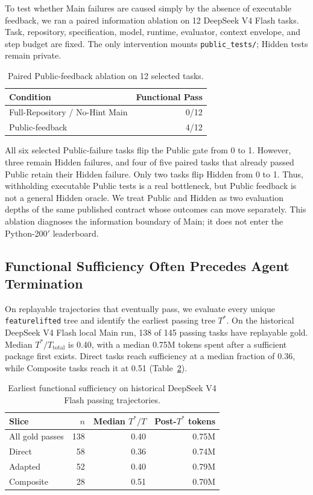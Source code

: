 \documentclass[acmsmall,anonymous,review,screen]{acmart}
\begin{document}
To test whether Main failures are caused simply by the absence of executable
feedback, we ran a paired information ablation on 12 DeepSeek V4 Flash tasks.
Task, repository, specification, model, runtime, evaluator, context envelope,
and step budget are fixed. The only intervention mounts
\texttt{public\_tests/}; Hidden tests remain private.

\begin{table}[t]
  \caption{Paired Public-feedback ablation on 12 selected tasks.}
  \label{tab:public-feedback}
  \centering
  \begin{tabular}{lr}
    \toprule
    \textbf{Condition} & \textbf{Functional Pass} \\
    \midrule
    Full-Repository / No-Hint Main & 0/12 \\
    Public-feedback & 4/12 \\
    \bottomrule
  \end{tabular}
\end{table}

All six selected Public-failure tasks flip the Public gate from 0 to 1.
However, three remain Hidden failures, and four of five paired tasks that
already passed Public retain their Hidden failure. Only two tasks flip Hidden
from 0 to 1. Thus, withholding executable Public tests is a real bottleneck,
but Public feedback is not a general Hidden oracle. We treat Public and Hidden
as two evaluation depths of the same published contract whose outcomes can move
separately. This ablation diagnoses the information boundary of Main; it does
not enter the Python-200$'$ leaderboard.

\subsection{Functional Sufficiency Often Precedes Agent Termination}

On replayable trajectories that eventually pass, we evaluate every unique
\texttt{featurelifted} tree and identify the earliest passing tree $T^*$. On
the historical DeepSeek V4 Flash local Main run, 138 of 145 passing tasks have
replayable gold. Median $T^*/T_{\mathrm{total}}$ is 0.40, with a median 0.75M
tokens spent after a sufficient package first exists. Direct tasks reach
sufficiency at a median fraction of 0.36, while Composite tasks reach it at
0.51 (Table~\ref{tab:tstar}).

\begin{table}[t]
  \caption{Earliest functional sufficiency on historical DeepSeek V4 Flash
  passing trajectories.}
  \label{tab:tstar}
  \centering
  \begin{tabular}{lrrr}
    \toprule
    \textbf{Slice} & \textbf{$n$} & \textbf{Median $T^*/T$}
      & \textbf{Post-$T^*$ tokens} \\
    \midrule
    All gold passes & 138 & 0.40 & 0.75M \\
    Direct & 58 & 0.36 & 0.74M \\
    Adapted & 52 & 0.40 & 0.79M \\
    Composite & 28 & 0.51 & 0.70M \\
    \bottomrule
  \end{tabular}
\end{table}
\end{document}
